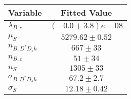 \begin{tabular}[t]{lc}
\hline
Variable &Fitted Value\\
\hline\hline
$\lambda_{B,c}$&$(-0.0\pm3.8)e-08$\\
\hline
$\mu_S$&$5279.62\pm0.52$\\
\hline
$n_{B, D^* D_s h}$&$667\pm33$\\
\hline
$n_{B,c}$&$51\pm34$\\
\hline
$n_S$&$1305\pm33$\\
\hline
$\sigma_{B, D^* D_s h}$&$67.2\pm2.7$\\
\hline
$\sigma_S$&$12.18\pm0.42$\\
\hline
\end{tabular}